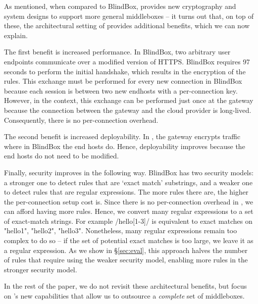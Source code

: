As mentioned, when compared to BlindBox, \sys provides new cryptography and system designs to support  more general middleboxes --  it turns out that, on top of these, the architectural setting of \sys provides additional benefits, which we can now explain.


%
The first benefit is increased performance. In BlindBox, two arbitrary user endpoints communicate over a modified version of HTTPS. BlindBox requires 97 seconds to perform the initial handshake, which results in the encryption of the rules. 
This exchange must be performed for every new connection in BlindBox because each session is between two new endhosts with a per-connection key.
However, in the \sys context, this exchange can be performed just once at the gateway because the connection between the gateway and the cloud provider is long-lived. Consequently, there is no per-connection overhead. 


The second benefit is increased deployability. In \sys, the gateway encrypts traffic where in BlindBox the end hosts do. Hence, deployability improves because the end hosts do not need to be modified.

Finally, security improves in the following way.
BlindBox has two security models: a stronger one to detect rules that are `exact match' substrings, and a weaker one to detect rules that are regular expressions. The more rules there are, the higher the per-connection setup cost is. 
Since there is no per-connection overhead  in \sys, we can afford having more rules. 
Hence, we convert many regular expressions to a set of exact-match strings. 
For example /hello[1-3]/ is equivalent to exact matches on "hello1", "hello2", "hello3".
Nonetheless, many regular expressions remain too complex to do so -- if the set of potential exact matches is too large, we leave it as a regular expression.
As we show in \S\ref{sec:eval}, this approach halves the number of rules that require using the weaker security model, enabling more rules in the stronger security model. 

In the rest of the paper, we do not revisit these architectural benefits, but focus  on \sys's new capabilities that allow us to outsource a {\it complete} set of middleboxes.
